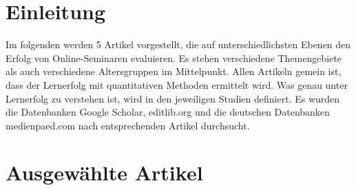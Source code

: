 \section{Einleitung}\label{einleitung}

Im folgenden werden 5 Artikel vorgestellt, die auf unterschiedlichsten
Ebenen den Erfolg von Online-Seminaren evaluieren. Es stehen
verschiedene Themengebiete als auch verschiedene Altersgruppen im
Mittelpunkt. Allen Artikeln gemein ist, dass der Lernerfolg mit
quantitativen Methoden ermittelt wird. Was genau unter Lernerfolg zu
verstehen ist, wird in den jeweiligen Studien definiert. Es wurden die
Datenbanken Google Scholar, editlib.org und die deutschen Datenbanken
medienpaed.com nach entsprechenden Artikel durchsucht.

\section{Ausgewählte Artikel}\label{ausgewuxe4hlte-artikel}

\textbf{}

